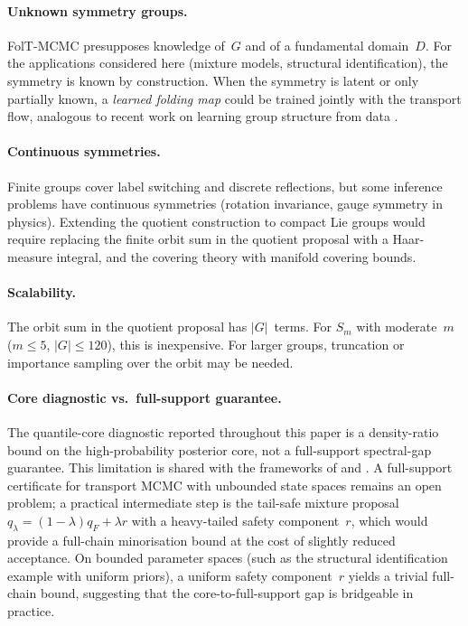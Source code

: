 \paragraph{Unknown symmetry groups.}
FolT-MCMC presupposes knowledge of~$G$ and of a fundamental
domain~$D$.  For the applications considered here (mixture models,
structural identification), the symmetry is known by construction.
When the symmetry is latent or only partially known, a
\emph{learned folding map} could be trained jointly with the
transport flow, analogous to recent work on learning group
structure from data \citep{Dehmamy2021}.

\paragraph{Continuous symmetries.}
Finite groups cover label switching and discrete reflections, but
some inference problems have continuous symmetries (rotation
invariance, gauge symmetry in physics).  Extending the quotient
construction to compact Lie groups would require replacing the
finite orbit sum in the quotient proposal with a
Haar-measure integral, and the covering theory with manifold
covering bounds.

\paragraph{Scalability.}
The orbit sum in the quotient proposal has $|G|$~terms.
For $S_m$ with moderate~$m$ ($m \leq 5$, $|G| \leq 120$),
this is inexpensive.  For larger groups, truncation or importance
sampling over the orbit may be needed.

\paragraph{Core diagnostic vs.\ full-support guarantee.}
The quantile-core diagnostic reported throughout this paper is a
density-ratio bound on the high-probability posterior core,
not a full-support spectral-gap guarantee.  This limitation is
shared with the frameworks of \citet{LCNF} and
\citet{CerTMCMC}.  A full-support certificate for
transport MCMC with unbounded state spaces remains an open problem;
a practical intermediate step is the tail-safe mixture proposal
$q_\lambda = (1{-}\lambda)q_F + \lambda r$ with a heavy-tailed
safety component~$r$, which would provide a full-chain
minorisation bound at the cost of slightly reduced acceptance.
On bounded parameter spaces (such as the structural identification
example with uniform priors), a uniform safety component~$r$
yields a trivial full-chain bound, suggesting that the
core-to-full-support gap is bridgeable in practice.



